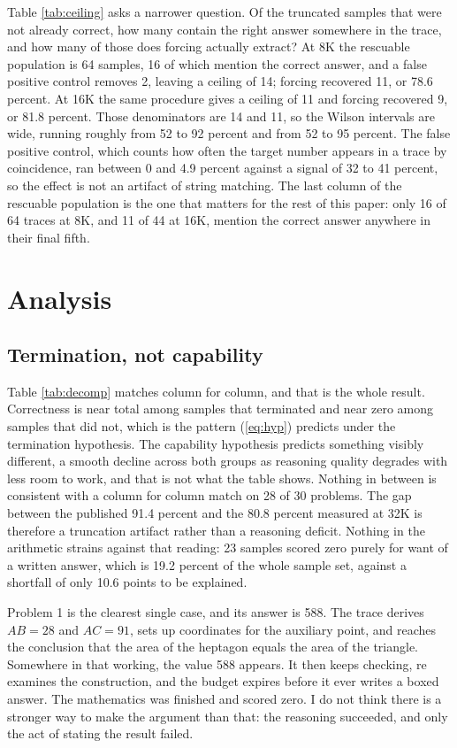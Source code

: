 \documentclass[conference]{IEEEtran}
\begin{document}
Table \ref{tab:ceiling} asks a narrower question. Of the truncated samples that
were not already correct, how many contain the right answer somewhere in the
trace, and how many of those does forcing actually extract? At 8K the rescuable
population is 64 samples, 16 of which mention the correct answer, and a false
positive control removes 2, leaving a ceiling of 14; forcing recovered 11, or 78.6
percent. At 16K the same procedure gives a ceiling of 11 and forcing recovered 9,
or 81.8 percent. Those denominators are 14 and 11, so the Wilson intervals are
wide, running roughly from 52 to 92 percent and from 52 to 95 percent. The false
positive control, which counts how often the target number appears in a trace by
coincidence, ran between 0 and 4.9 percent against a signal of 32 to 41 percent,
so the effect is not an artifact of string matching. The last column of the
rescuable population is the one that matters for the rest of this paper: only 16
of 64 traces at 8K, and 11 of 44 at 16K, mention the correct answer anywhere in
their final fifth.

\section{Analysis}

\subsection{Termination, not capability}

Table \ref{tab:decomp} matches column for column, and that is the whole result.
Correctness is near total among samples that terminated and near zero among
samples that did not, which is the pattern (\ref{eq:hyp}) predicts under the
termination hypothesis. The capability hypothesis predicts something visibly
different, a smooth decline across both groups as reasoning quality degrades with
less room to work, and that is not what the table shows. Nothing in between is
consistent with a column for column match on 28 of 30 problems. The gap between
the published 91.4 percent and the 80.8 percent measured at 32K is therefore a
truncation artifact rather than a reasoning deficit. Nothing in the arithmetic
strains against that reading: 23 samples scored zero purely for want of a written
answer, which is 19.2 percent of the whole sample set, against a shortfall of only
10.6 points to be explained.

Problem 1 is the clearest single case, and its answer is 588. The trace derives
$AB = 28$ and $AC = 91$, sets up coordinates for the auxiliary point, and reaches
the conclusion that the area of the heptagon equals the area of the triangle.
Somewhere in that working, the value 588 appears. It then keeps checking, re examines
the construction, and the budget expires before it ever writes a boxed answer. The
mathematics was finished and scored zero. I do not think there is a stronger way
to make the argument than that: the reasoning succeeded, and only the act of
stating the result failed.
\end{document}
